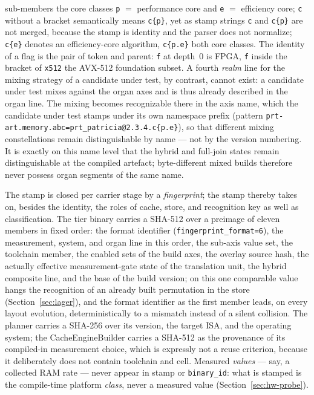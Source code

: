 \begin{nurlang}
sub-members the core classes \texttt{p} $=$ performance core and \texttt{e} $=$ efficiency core; \texttt{c}
without a bracket semantically means \texttt{c\{p\}}, yet as stamp strings \texttt{c} and \texttt{c\{p\}}
are not merged, because the stamp is identity and the parser does not normalize; \texttt{c\{e\}} denotes an
efficiency-core algorithm, \texttt{c\{p.e\}} both core classes. The identity of a flag is the pair of token
and parent: \texttt{f} at depth~0 is FPGA, \texttt{f} inside the bracket of \texttt{x512} the AVX-512
foundation subset.
A fourth \emph{realm} line for the mixing strategy of a candidate under test, by contrast, cannot exist: a
candidate under test mixes against the organ axes and is thus already described in the organ line. The mixing becomes
recognizable there in the axis name, which the candidate under test stamps under its own namespace prefix
(pattern \texttt{prt-art.memory.abc=prt\_patricia@2.3.4.c\{p.e\}}), so that different
mixing constellations remain distinguishable by name --- not by the version numbering. It is exactly on
this name level that the hybrid and full-join states remain distinguishable at the compiled artefact; byte-different
mixed builds therefore never possess organ segments of the same name.

The stamp is closed per carrier stage by a \emph{fingerprint}; the stamp thereby takes on, besides the
identity, the roles of cache, store, and recognition key as well as classification. The tier binary carries a
SHA-512 over a preimage of eleven members in fixed order: the format identifier
(\texttt{fingerprint\_format=6}), the measurement, system, and organ line in this order, the
sub-axis value set, the toolchain member, the enabled sets of the build axes, the
overlay source hash, the actually effective measurement-gate state of the translation unit, the
hybrid composite line, and the base of the build version; on this one comparable value hangs the
recognition of an already built permutation in the store (Section~\ref{sec:lager}), and the
format identifier as the first member leads, on every layout evolution, deterministically to a mismatch
instead of a silent collision. The planner carries a SHA-256 over its version, the target ISA, and the operating system;
the CacheEngineBuilder carries a SHA-512 as the provenance of its compiled-in measurement choice, which is
expressly not a reuse criterion, because it deliberately does not contain toolchain and cell.
Measured \emph{values} --- say, a collected RAM rate --- never appear in stamp or
\texttt{binary\_id}: what is stamped is the compile-time platform \emph{class}, never a measured value
(Section~\ref{sec:hw-probe}).

\end{nurlang}
